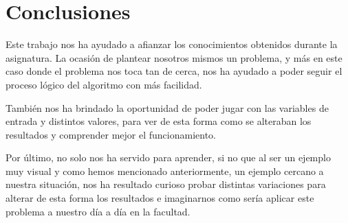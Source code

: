 \documentclass[11pt, a4paper, titlepage]{article}
\begin{document}
\section{Conclusiones}
Este trabajo nos ha ayudado a afianzar los conocimientos obtenidos durante la asignatura. La ocasión de plantear nosotros mismos un problema, y más en este caso donde el problema nos toca tan de cerca, nos ha ayudado a poder seguir el proceso lógico del algoritmo con más facilidad.

\vspace{5mm}

También nos ha brindado la oportunidad de poder jugar con las variables de entrada y distintos valores, para ver de esta forma como se alteraban los resultados y comprender mejor el funcionamiento.

\vspace{5mm}

Por último, no solo nos ha servido para aprender, si no que al ser un ejemplo muy visual y como hemos mencionado anteriormente, un ejemplo cercano a nuestra situación, nos ha resultado curioso probar distintas variaciones para alterar de esta forma los resultados e imaginarnos como sería aplicar este problema a nuestro día a día en la facultad.
\end{document}
